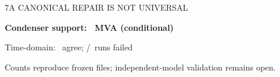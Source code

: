 {\begin{minipage}[t][\PosterLowerRowHeight][t]{\PosterHalfWidth}
\begin{PosterPanel}{\PosterLowerRowHeight}{7}{A CANONICAL REPAIR IS NOT UNIVERSAL}
\begin{minipage}[t]{208mm}
    \end{minipage}\par
    \vspace{2mm}
    \noindent\begin{minipage}[c][10mm][c]{208mm}\centering
      {\FigureSize\bfseries\color{IASGold!70!black}Condenser support: \CondenserMVA\ MVA (conditional)}
    \end{minipage}\hspace{4mm}%
    \begin{minipage}[c][10mm][c]{208mm}\centering
      {\FigureSize\color{IASDarkText}Time-domain: \TDSAgreement\ agree; \TDSSolverFailures/\TDSTotal\ runs failed}
    \end{minipage}\par
    \vspace{1mm}
    \noindent\begin{minipage}[c][10mm][c]{\linewidth}\centering
      {\FigureSize\color{IASGray}Counts reproduce frozen files; independent-model validation remains open.}
    \end{minipage}\par
  \end{PosterPanel}
\end{minipage}%
}%
\ifdefined\PosterFull
  \PosterSectionContent
  \let\PosterSectionFinish\relax
\else
  \def\PosterPageWidth{\PosterPreviewHalfPageWidth}
  \def\PosterPageHeight{\PosterPreviewLowerPageHeight}
  \def\PosterPreviewLeft{\PosterPreviewHalfLeft}
  
  \begin{frame}[t]
  \vspace*{\PosterPreviewTop}
  \noindent\hspace*{\PosterPreviewLeft}%
  \PosterSectionContent
  \end{frame}
  \def\PosterSectionFinish{}
\fi
\PosterSectionFinish
